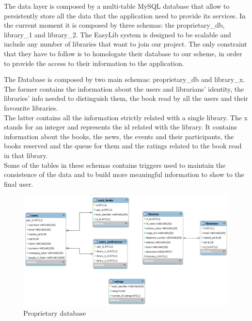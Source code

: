 The data layer is composed by a multi-table MySQL database that allow to persistently store all the data that the application need to provide its services. In the current moment it is composed by three schemas: the proprietary\_db, library\_1 and library\_2. The EasyLib system is designed to be scalable and include any number of libraries that want to join our project. The only constraint that they have to follow is to homologate their database to our scheme, in order to provide the access to their information to the application. 

The Database is composed by two main schemas: proprietary\_db and library\_x. The former contains the information about the users and librarians’ identity, the libraries’ info needed to distinguish them, the book read by all the users and their favourite libraries.\\
The latter contains all the information strictly related with a single library. The x stands for an integer and represents the id related with the library. It contains information about the books, the news, the events and their participants, the books reserved and the queue for them and the ratings related to the book read in that library.\\
Some of the tables in these schemas contains triggers used to maintain the consistence of the data and to build more meaningful information to show to the final user. 


\vspace*{0cm}
\begin{figure}[H]
	\centering
	\includegraphics[scale=0.50]{Images/Diagrams/proprietary_db_UML}
	\caption{Proprietary database}
\end{figure}

